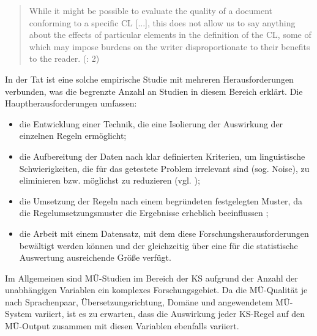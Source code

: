 \begin{quote}
While it might be possible to evaluate the quality of a document conforming to a specific CL [...], this does not allow us to say anything about the effects of particular elements in the definition of the CL, some of which may impose burdens on the writer disproportionate to their benefits to the reader. (\citealt{DouglasHurst1996}: 2)
\end{quote}

In der Tat ist eine solche empirische Studie mit mehreren Herausforderungen verbunden, was die begrenzte Anzahl an Studien in diesem Bereich erklärt. Die Hauptherausforderungen umfassen:

\begin{itemize}
\item die Entwicklung einer Technik, die eine Isolierung der Auswirkung der einzelnen Regeln ermöglicht;
\item die Aufbereitung der Daten nach klar definierten Kriterien, um linguistische Schwierigkeiten, die für das getestete Problem irrelevant sind (sog. Noise), zu eliminieren bzw. möglichst zu reduzieren (vgl. \citealt{KingFalkedal1990});
\item die Umsetzung der Regeln nach einem begründeten festgelegten Muster, da die Regelumsetzungsmuster die Ergebnisse erheblich beeinflussen \citep[74]{Roturier2006};
\item die Arbeit mit einem Datensatz, mit dem diese Forschungsherausforderungen bewältigt werden können und der gleichzeitig über eine für die statistische Auswertung ausreichende Größe verfügt.
\end{itemize}

Im Allgemeinen sind MÜ-Studien im Bereich der KS aufgrund der Anzahl der unabhängigen Variablen ein komplexes Forschungsgebiet. Da die MÜ-Qualität je nach Sprachenpaar, Übersetzungsrichtung, Domäne und angewendetem MÜ-System variiert, ist es zu erwarten, dass die Auswirkung jeder KS-Regel auf den MÜ-Output zusammen mit diesen Variablen ebenfalls variiert.

